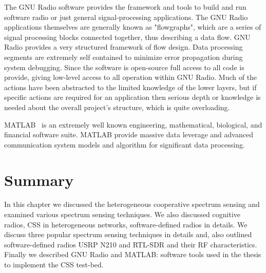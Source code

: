 The GNU Radio software provides the framework and tools to build and run software radio or just general signal-processing applications. The GNU Radio applications themselves are generally known as "flowgraphs", which are a series of signal processing blocks connected together, thus describing a data flow. GNU Radio provides a very structured framework of flow design. Data processing segments are extremely self contained to minimize error propagation during system debugging. Since the software is open-source full access to all code is provide, giving low-level access to all operation within GNU Radio. Much of the actions have been abstracted to the limited knowledge of the lower layers, but if specific actions are required for an application then serious depth or knowledge is needed about the overall project’s structure, which is quite overloading.

MATLAB~\cite{matlab} is an extremely well known engineering, mathematical, biological, and financial software suite. MATLAB provide massive data leverage and advanced communication system models and algorithm for significant data processing.

\section{Summary}
In this chapter we discussed the heterogeneous cooperative spectrum sensing and examined various spectrum sensing techniques. We also discussed cognitive radios, CSS in heterogeneous networks, software-defined radios in details. We discuss three popular spectrum sensing techniques in details and, also outlined software-defined radios USRP N210 and RTL-SDR and their RF characteristics. Finally we described GNU Radio and MATLAB: software tools used in the thesis to implement the CSS test-bed. 
